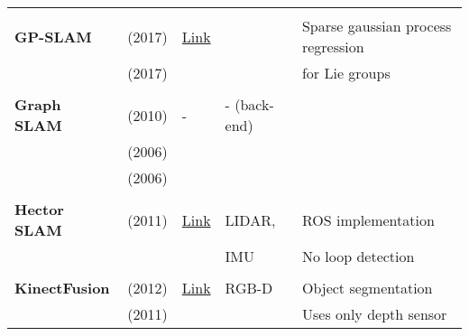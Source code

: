 \documentclass[a4paper,12pt]{scrartcl}
\begin{document}
{\begin{longtable}{l|l|l|l|l}
                           &                                   &                                                                    &                       &\\
    \textbf{GP-SLAM}       & \cite{Yan2017} (2017)             & {\href{https://github.com/gtrll/gpslam}{Link}}                     &                       & Sparse gaussian process regression\\
                           & \cite{Dong2017} (2017)            &                                                                    &                       & for Lie groups\\
                           &                                   &                                                                    &                       &\\
    \textbf{Graph SLAM}    & \cite{Grisetti2010} (2010)        & -                                                                  & - (back-end)          &\\
                           & \cite{Olson2006} (2006)           &                                                                    &                       &\\
                           & \cite{Thrun2006} (2006)           &                                                                    &                       &\\
                           &                                   &                                                                    &                       &\\
    \textbf{Hector SLAM}   & \cite{Kohlbrecher2011} (2011)     & {\href{https://github.com/tu-darmstadt-ros-pkg/hector_slam}{Link}} & LIDAR,                & ROS implementation\\
                           &                                   &                                                                    & IMU                   & No loop detection\\
                           &                                   &                                                                    &                       &\\
    \textbf{KinectFusion}  & \cite{Pirovano2012} (2012)        & {\href{https://github.com/PointCloudLibrary/pcl}{Link}}            & RGB-D                 & Object segmentation\\
                           & \cite{Izadi2011} (2011)           &                                                                    &                       & Uses only depth sensor\\

\end{longtable}}
\end{document}
